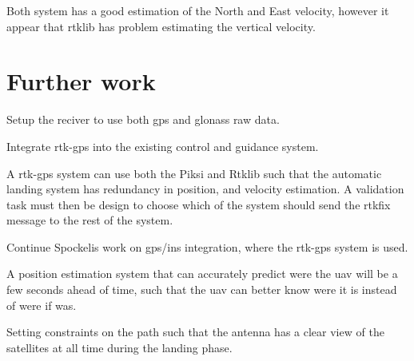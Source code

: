 Both system has a good estimation of the North and East velocity, however it appear that rtklib has problem estimating the vertical velocity.


\section{Further work}
Setup the reciver to use both gps and glonass raw data.

Integrate \gls{rtk-gps} into the existing control and guidance system.

A \gls{rtk-gps} system can use both the Piksi and Rtklib such that the automatic landing system has redundancy in position, and velocity estimation. A validation task must then be design to choose which of the system should send the rtkfix message to the rest of the system.

Continue Spockelis work on gps/ins integration, where the rtk-gps system is used.

A position estimation system that can accurately predict were the \gls{uav} will be a few seconds ahead of time, such that the \gls{uav} can better know were it is instead of were if was.

Setting constraints on the path such that the antenna has a clear view of the satellites at all time during the landing phase. 
\cleardoublepage